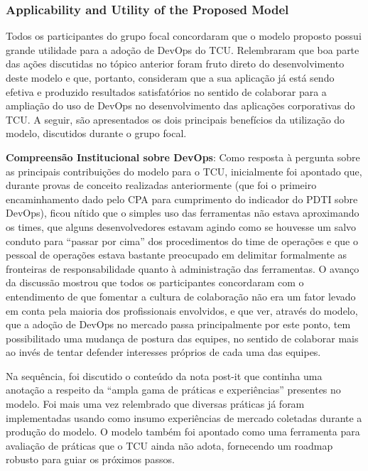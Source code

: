 \subsubsection{Applicability and Utility of the Proposed Model}

{
\color{red}
Todos os participantes do grupo focal concordaram que o modelo proposto possui grande
utilidade para a adoção de DevOps do TCU. Relembraram que boa parte das ações discutidas
no tópico anterior foram fruto direto do desenvolvimento deste modelo e que,
portanto, consideram que a sua aplicação já está sendo efetiva e produzido resultados
satisfatórios no sentido de colaborar para a ampliação do uso de DevOps no desenvolvimento
das aplicações corporativas do TCU. A seguir, são apresentados os dois principais
benefícios da utilização do modelo, discutidos durante o grupo focal.

\textbf{Compreensão Institucional sobre DevOps}: Como resposta à pergunta sobre
as principais contribuições do modelo para o TCU, inicialmente
foi apontado que, durante provas de conceito realizadas anteriormente (que foi o
primeiro encaminhamento dado pelo CPA para cumprimento do indicador do PDTI sobre
DevOps), ficou nítido que o simples uso das ferramentas não estava aproximando os times,
que alguns desenvolvedores estavam agindo como se houvesse um salvo conduto para
“passar por cima” dos procedimentos do time de operações e que o pessoal de operações
estava bastante preocupado em delimitar formalmente as fronteiras de responsabilidade
quanto à administração das ferramentas. O avanço da discussão mostrou que todos os
participantes concordaram com o entendimento de que fomentar a cultura de colaboração
não era um fator levado em conta pela maioria dos profissionais envolvidos, e que ver,
através do modelo, que a adoção de DevOps no mercado passa principalmente por este
ponto, tem possibilitado uma mudança de postura das equipes, no sentido de colaborar
mais ao invés de tentar defender interesses próprios de cada uma das equipes.

Na sequência, foi discutido o conteúdo da nota post-it que continha uma anotação
a respeito da “ampla gama de práticas e experiências” presentes no modelo. Foi mais
uma vez relembrado que diversas práticas já foram implementadas usando como insumo
experiências de mercado coletadas durante a produção do modelo. O modelo também foi
apontado como uma ferramenta para avaliação de práticas que o TCU ainda não adota,
fornecendo um roadmap robusto para guiar os próximos passos.

}
